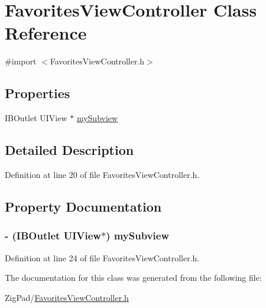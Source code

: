 \hypertarget{interface_favorites_view_controller}{
\section{FavoritesViewController Class Reference}
\label{interface_favorites_view_controller}
}


{\ttfamily \#import $<$FavoritesViewController.h$>$}

\subsection*{Properties}
\begin{DoxyCompactItemize}
\item 
IBOutlet UIView $\ast$ \hyperlink{interface_favorites_view_controller_acc52a7c4d35472a5e41a1e078081435b}{mySubview}
\end{DoxyCompactItemize}


\subsection{Detailed Description}


Definition at line 20 of file FavoritesViewController.h.



\subsection{Property Documentation}
\hypertarget{interface_favorites_view_controller_acc52a7c4d35472a5e41a1e078081435b}{
\subsubsection[{mySubview}]{\setlength{\rightskip}{0pt plus 5cm}-\/ (IBOutlet UIView$\ast$) mySubview}}
\label{interface_favorites_view_controller_acc52a7c4d35472a5e41a1e078081435b}


Definition at line 24 of file FavoritesViewController.h.



The documentation for this class was generated from the following file:\begin{DoxyCompactItemize}
\item 
ZigPad/\hyperlink{_favorites_view_controller_8h}{FavoritesViewController.h}\end{DoxyCompactItemize}
